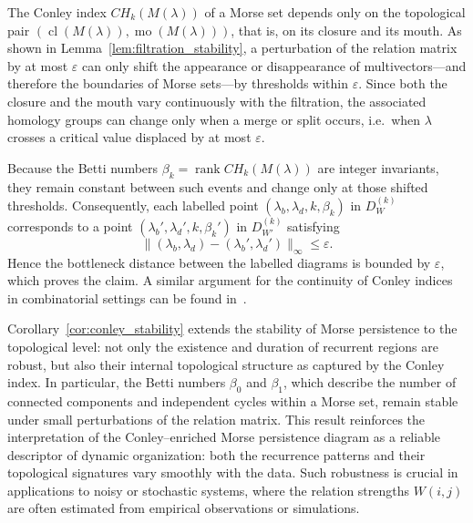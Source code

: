 \documentclass{article}
\theoremstyle{definition}
\theoremstyle{plain}
\theoremstyle{remark}
\newcommand{\1}{\mathbbm{1}}  %
\renewenvironment{proof}{{\bf Proof:\ }}{\qedsymbol}%
\begin{document}
\begin{proof}
The Conley index $CH_k(M(\lambda))$ of a Morse set depends only on the
topological pair $(\operatorname{cl}(M(\lambda)), \operatorname{mo}(M(\lambda)))$,
that is, on its closure and its mouth.
As shown in Lemma~\ref{lem:filtration_stability}, a perturbation of the
relation matrix by at most $\varepsilon$ can only shift the appearance or
disappearance of multivectors---and therefore the boundaries of Morse
sets—by thresholds within $\varepsilon$.
Since both the closure and the mouth vary continuously with the
filtration, the associated homology groups can change only when a merge
or split occurs, i.e.\ when $\lambda$ crosses a critical value displaced
by at most $\varepsilon$.

Because the Betti numbers $\beta_k = \operatorname{rank} CH_k(M(\lambda))$
are integer invariants, they remain constant between such events and
change only at those shifted thresholds.
Consequently, each labelled point
$(\lambda_b,\lambda_d,k,\beta_k)$ in $D_W^{(k)}$ corresponds to a point
$(\lambda_b',\lambda_d',k,\beta_k')$ in $D_{W'}^{(k)}$ satisfying
\[
\|(\lambda_b,\lambda_d) - (\lambda_b',\lambda_d')\|_\infty \le \varepsilon.
\]
Hence the bottleneck distance between the labelled diagrams is bounded by
$\varepsilon$, which proves the claim.
A similar argument for the continuity of Conley indices in combinatorial
settings can be found in~\cite{kaczynski2004computational,
mrozek2017conley}.
\end{proof}

\medskip
\noindent
Corollary~\ref{cor:conley_stability} extends the stability of Morse
persistence to the topological level: not only the existence and duration
of recurrent regions are robust, but also their internal topological
structure as captured by the Conley index.
In particular, the Betti numbers $\beta_0$ and $\beta_1$, which describe
the number of connected components and independent cycles within a Morse
set, remain stable under small perturbations of the relation matrix.
This result reinforces the interpretation of the
Conley--enriched Morse persistence diagram as a reliable descriptor of
dynamic organization: both the recurrence patterns and their topological
signatures vary smoothly with the data.
Such robustness is crucial in applications to noisy or stochastic
systems, where the relation strengths $W(i,j)$ are often estimated from
empirical observations or simulations.
 
\end{document}
